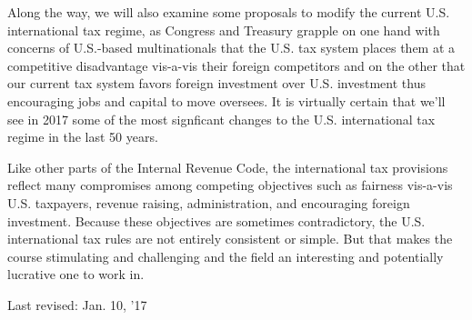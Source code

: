 Along the way, we will also examine some proposals to modify the current U.S. international tax regime, as Congress and Treasury grapple on one hand with concerns of U.S.-based multinationals that the U.S. tax system places them at a competitive disadvantage vis-a-vis their foreign competitors and on the other that our current tax system favors foreign investment over U.S. investment thus encouraging jobs and capital to move oversees.  It is virtually certain that we'll see in 2017 some of the most signficant changes to the U.S. international tax regime in the last 50 years.  

Like other parts of the Internal Revenue Code, the international tax provisions reflect many compromises among competing objectives such as fairness vis-a-vis U.S. taxpayers, revenue raising, administration, and encouraging foreign investment. Because these objectives are sometimes contradictory, the U.S. international tax rules are not entirely consistent or simple.  But that makes the course stimulating and challenging and the field an interesting and potentially lucrative one to work in.  

	\begin{framed}
		Last revised:  Jan. 10, '17
			\end{framed}

 